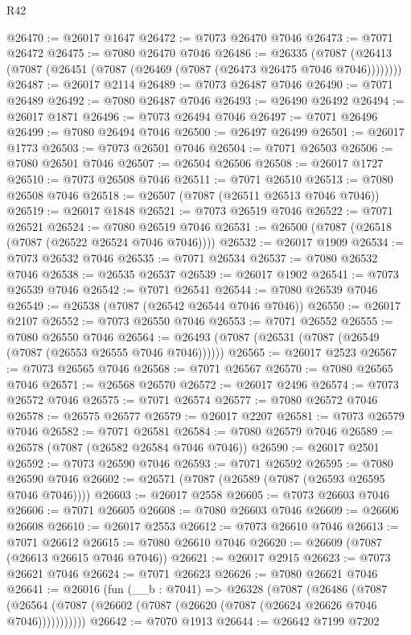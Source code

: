\begin{lexlean}{R42}
\begin{coremodule}
{@26470 := @26017 @1647
@26472 := @7073 @26470 @7046
@26473 := @7071 @26472
@26475 := @7080 @26470 @7046
@26486 := @26335
    (@7087 (@26413 (@7087 (@26451 (@7087 (@26469 (@7087 (@26473 @26475 @7046 @7046))))))))
@26487 := @26017 @2114
@26489 := @7073 @26487 @7046
@26490 := @7071 @26489
@26492 := @7080 @26487 @7046
@26493 := @26490 @26492
@26494 := @26017 @1871
@26496 := @7073 @26494 @7046
@26497 := @7071 @26496
@26499 := @7080 @26494 @7046
@26500 := @26497 @26499
@26501 := @26017 @1773
@26503 := @7073 @26501 @7046
@26504 := @7071 @26503
@26506 := @7080 @26501 @7046
@26507 := @26504 @26506
@26508 := @26017 @1727
@26510 := @7073 @26508 @7046
@26511 := @7071 @26510
@26513 := @7080 @26508 @7046
@26518 := @26507 (@7087 (@26511 @26513 @7046 @7046))
@26519 := @26017 @1848
@26521 := @7073 @26519 @7046
@26522 := @7071 @26521
@26524 := @7080 @26519 @7046
@26531 := @26500 (@7087 (@26518 (@7087 (@26522 @26524 @7046 @7046))))
@26532 := @26017 @1909
@26534 := @7073 @26532 @7046
@26535 := @7071 @26534
@26537 := @7080 @26532 @7046
@26538 := @26535 @26537
@26539 := @26017 @1902
@26541 := @7073 @26539 @7046
@26542 := @7071 @26541
@26544 := @7080 @26539 @7046
@26549 := @26538 (@7087 (@26542 @26544 @7046 @7046))
@26550 := @26017 @2107
@26552 := @7073 @26550 @7046
@26553 := @7071 @26552
@26555 := @7080 @26550 @7046
@26564 := @26493 (@7087 (@26531 (@7087 (@26549 (@7087 (@26553 @26555 @7046 @7046))))))
@26565 := @26017 @2523
@26567 := @7073 @26565 @7046
@26568 := @7071 @26567
@26570 := @7080 @26565 @7046
@26571 := @26568 @26570
@26572 := @26017 @2496
@26574 := @7073 @26572 @7046
@26575 := @7071 @26574
@26577 := @7080 @26572 @7046
@26578 := @26575 @26577
@26579 := @26017 @2207
@26581 := @7073 @26579 @7046
@26582 := @7071 @26581
@26584 := @7080 @26579 @7046
@26589 := @26578 (@7087 (@26582 @26584 @7046 @7046))
@26590 := @26017 @2501
@26592 := @7073 @26590 @7046
@26593 := @7071 @26592
@26595 := @7080 @26590 @7046
@26602 := @26571 (@7087 (@26589 (@7087 (@26593 @26595 @7046 @7046))))
@26603 := @26017 @2558
@26605 := @7073 @26603 @7046
@26606 := @7071 @26605
@26608 := @7080 @26603 @7046
@26609 := @26606 @26608
@26610 := @26017 @2553
@26612 := @7073 @26610 @7046
@26613 := @7071 @26612
@26615 := @7080 @26610 @7046
@26620 := @26609 (@7087 (@26613 @26615 @7046 @7046))
@26621 := @26017 @2915
@26623 := @7073 @26621 @7046
@26624 := @7071 @26623
@26626 := @7080 @26621 @7046
@26641 := @26016
    (fun (__b : @7041) =>
    @26328
      (@7087
        (@26486
          (@7087 (@26564 (@7087 (@26602 (@7087 (@26620 (@7087 (@26624 @26626 @7046 @7046)))))))))))
@26642 := @7070 @1913
@26644 := @26642 @7199 @7202
}
\end{coremodule}
\end{lexlean}
